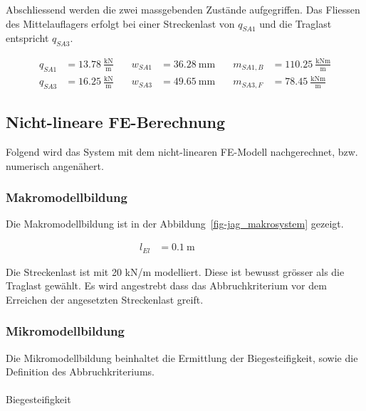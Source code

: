 \documentclass[
  11pt,
  letterpaper,
]{scrreprt}
\makeatletter
\let\oldparagraph\paragraph
\renewcommand{\paragraph}{
    \@ifstar
      \xxxParagraphStar
      \xxxParagraphNoStar
  }
\newcommand{\xxxParagraphStar}[1]{\oldparagraph*{#1}\mbox{}}
\newcommand{\xxxParagraphNoStar}[1]{\oldparagraph{#1}\mbox{}}
\makeatother
\begin{document}
Abschliessend werden die zwei massgebenden Zustände aufgegriffen. Das
Fliessen des Mittelauflagers erfolgt bei einer Streckenlast von
\(q_{SA1}\) und die Traglast entspricht \(q_{SA3}\).

\[
\begin{aligned}
q_{SA1}& = 13.78 \ \frac{\mathrm{kN}}{\mathrm{m}} \quad & w_{SA1}& = 36.28 \ \mathrm{mm} \quad & m_{SA1 , B}& = 110.25 \ \frac{\mathrm{kNm}}{\mathrm{m}} \\ 
q_{SA3}& = 16.25 \ \frac{\mathrm{kN}}{\mathrm{m}} \quad & w_{SA3}& = 49.65 \ \mathrm{mm} \quad & m_{SA3 , F}& = 78.45 \ \frac{\mathrm{kNm}}{\mathrm{m}} \end{aligned}
\]

\subsection{Nicht-lineare
FE-Berechnung}\label{nicht-lineare-fe-berechnung}

Folgend wird das System mit dem nicht-linearen FE-Modell nachgerechnet,
bzw. numerisch angenähert.

\subsubsection{Makromodellbildung}\label{makromodellbildung-5}

Die Makromodellbildung ist in der Abbildung~\ref{fig-jag_makrosystem}
gezeigt.

\[
\begin{aligned}
l_{El}& = 0.1 \ \mathrm{m} \quad &  \quad &  
 \end{aligned}
\]

Die Streckenlast ist mit 20 kN/m modelliert. Diese ist bewusst grösser
als die Traglast gewählt. Es wird angestrebt dass das Abbruchkriterium
vor dem Erreichen der angesetzten Streckenlast greift.

\subsubsection{Mikromodellbildung}\label{mikromodellbildung-5}

Die Mikromodellbildung beinhaltet die Ermittlung der Biegesteifigkeit,
sowie die Definition des Abbruchkriteriums.

\paragraph{Biegesteifigkeit}\label{biegesteifigkeit-1}
\end{document}
